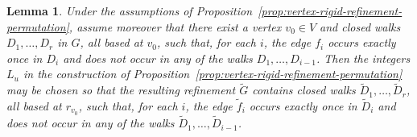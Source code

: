 \documentclass[10pt,a4paper]{amsart}
\newtheorem{lemma}{Lemma}
\begin{document}
\begin{lemma}\label{lem:triangular-walks-lift}
Under the assumptions of
Proposition~\ref{prop:vertex-rigid-refinement-permutation},
assume moreover that there exist a vertex $v_0\in V$ and closed walks
$D_1,\dots,D_r$ in $G$, all based at $v_0$, such that, for each $i$,
the edge $f_i$ occurs exactly once in $D_i$ and does not occur in any
of the walks $D_1,\dots,D_{i-1}$. Then the integers $L_u$ in the construction of
Proposition~\ref{prop:vertex-rigid-refinement-permutation} may be chosen
so that the resulting refinement $\widetilde G$ contains closed walks
$\widetilde D_1,\dots,\widetilde D_r$, all based at $r_{v_0}$, such
that, for each $i$, the edge $\widetilde f_i$ occurs exactly once in
$\widetilde D_i$ and does not occur in any of the walks
$\widetilde D_1,\dots,\widetilde D_{i-1}$.
\end{lemma}
\end{document}
